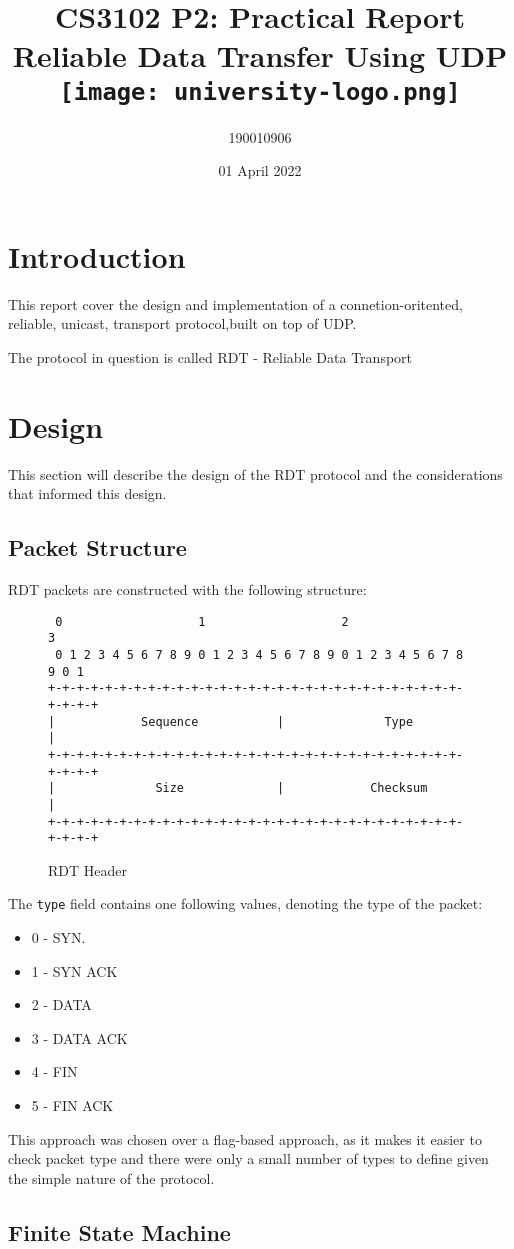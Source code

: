 \documentclass[12pt]{article}
\title{
{CS3102 P2: Practical Report}\\
{\large Reliable Data Transfer Using UDP}\\
{\texttt{[image: university-logo.png]}}
}
\author{190010906}
\date{01 April 2022}
\begin{document}
\maketitle

\newpage

\section{Introduction}

This report cover the design and implementation of a connetion-oritented, reliable, unicast, transport protocol,built on top of UDP.

The protocol in question is called RDT - Reliable Data Transport

\section{Design}

This section will describe the design of the RDT protocol and the considerations that informed this design.

\subsection{Packet Structure}

RDT packets are constructed with the following structure:

\begin{figure}[h]
\begin{verbatim}
 0                   1                   2                   3  
 0 1 2 3 4 5 6 7 8 9 0 1 2 3 4 5 6 7 8 9 0 1 2 3 4 5 6 7 8 9 0 1
+-+-+-+-+-+-+-+-+-+-+-+-+-+-+-+-+-+-+-+-+-+-+-+-+-+-+-+-+-+-+-+-+
|            Sequence           |              Type             |
+-+-+-+-+-+-+-+-+-+-+-+-+-+-+-+-+-+-+-+-+-+-+-+-+-+-+-+-+-+-+-+-+
|              Size             |            Checksum           |
+-+-+-+-+-+-+-+-+-+-+-+-+-+-+-+-+-+-+-+-+-+-+-+-+-+-+-+-+-+-+-+-+
\end{verbatim}
\caption{RDT Header}
\end{figure}

The \texttt{type} field contains one following values, denoting the type of the packet:

\begin{itemize}
    \item 0 - SYN.
    \item 1 - SYN ACK
    \item 2 - DATA
    \item 3 - DATA ACK 
    \item 4 - FIN 
    \item 5 - FIN ACK
\end{itemize}

This approach was chosen over a flag-based approach, as it makes it easier to check packet type and there were only a small number of types to define given the simple nature of the protocol.

\subsection{Finite State Machine}


\end{document}
